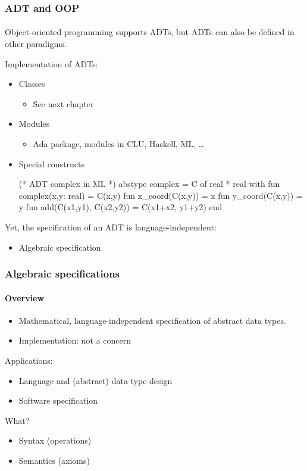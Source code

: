 \documentclass{beamer}
\begin{document}
\begin{frame}[fragile]
\frametitle{ADT and OOP}
\framesubtitle{}
Object-oriented programming supports ADTs, but ADTs
can also be defined in other paradigms.
\bigskip

Implementation of ADTs: 
\begin{itemize}
\item Classes
\begin{itemize}
\item See next chapter
\end{itemize}

\item Modules
\begin{itemize}
\item Ada package, modules in CLU, Haskell, ML, \ldots
\end{itemize}

\item Special constructs
\begin{cplus3}
(* ADT complex in ML *)
abstype complex = C of real * real with
    fun complex(x,y: real) = C(x,y)
    fun x_coord(C(x,y)) = x
    fun y_coord(C(x,y)) = y
    fun add(C(x1,y1), C(x2,y2)) = C(x1+x2, y1+y2)
end
\end{cplus3}
\end{itemize}

Yet, the specification of an ADT is language-independent:
\begin{itemize}
\item Algebraic specification 
\end{itemize}
\end{frame}

\begin{frame}[fragile]
\frametitle{Algebraic specifications}
\framesubtitle{Overview}

\begin{itemize}
\item Mathematical, language-independent specification of abstract data types.
\item Implementation: not a concern
\end{itemize}

Applications:
\begin{itemize}
\item Language and (abstract) data type design
\item Software specification
\end{itemize}

What?
\begin{itemize}
\item Syntax (operations)
\item Semantics (axioms)
\end{itemize}


\end{frame}
\end{document}
